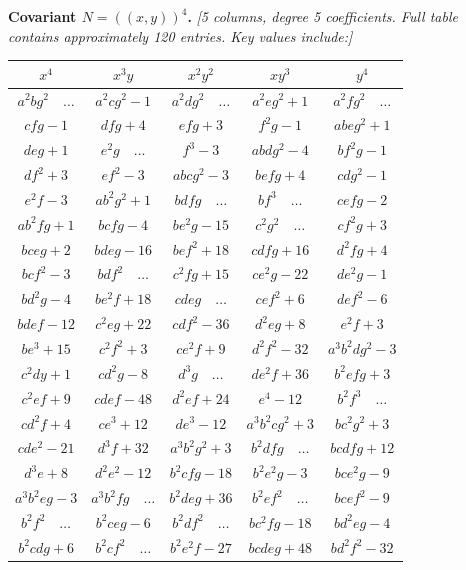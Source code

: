 \documentclass[11pt,a4paper]{book}
\begin{document}
\textbf{Covariant $N = (\!\!(x,y)\!\!)^{4}$.} \textit{[5 columns, degree 5 coefficients. Full table contains approximately 120 entries. Key values include:]}
\begin{center}
\small
\begin{tabular}{|c|c|c|c|c|}
\hline
$x^{4}$ & $x^{3}y$ & $x^{2}y^{2}$ & $xy^{3}$ & $y^{4}$ \\
\hline
$a^{2}bg^{2}\quad\dots$ & $a^{2}cg^{2}-1$ & $a^{2}dg^{2}\quad\dots$ & $a^{2}eg^{2}+1$ & $a^{2}fg^{2}\quad\dots$ \\
$cfg-1$ & $dfg+4$ & $efg+3$ & $f^{2}g-1$ & $abeg^{2}+1$ \\
$deg+1$ & $e^{2}g\quad\dots$ & $f^{3}-3$ & $abdg^{2}-4$ & $bf^{2}g-1$ \\
$df^{2}+3$ & $ef^{2}-3$ & $abcg^{2}-3$ & $befg+4$ & $cdg^{2}-1$ \\
$e^{2}f-3$ & $ab^{2}g^{2}+1$ & $bdfg\quad\dots$ & $bf^{3}\quad\dots$ & $cefg-2$ \\
$ab^{2}fg+1$ & $bcfg-4$ & $be^{2}g-15$ & $c^{2}g^{2}\quad\dots$ & $cf^{2}g+3$ \\
$bceg+2$ & $bdeg-16$ & $bef^{2}+18$ & $cdfg+16$ & $d^{2}fg+4$ \\
$bcf^{2}-3$ & $bdf^{2}\quad\dots$ & $c^{2}fg+15$ & $ce^{2}g-22$ & $de^{2}g-1$ \\
$bd^{2}g-4$ & $be^{2}f+18$ & $cdeg\quad\dots$ & $cef^{2}+6$ & $def^{2}-6$ \\
$bdef-12$ & $c^{2}eg+22$ & $cdf^{2}-36$ & $d^{2}eg+8$ & $e^{2}f+3$ \\
$be^{3}+15$ & $c^{2}f^{2}+3$ & $ce^{2}f+9$ & $d^{2}f^{2}-32$ & $a^{3}b^{2}dg^{2}-3$ \\
$c^{2}dy+1$ & $cd^{2}g-8$ & $d^{3}g\quad\dots$ & $de^{2}f+36$ & $b^{2}efg+3$ \\
$c^{2}ef+9$ & $cdef-48$ & $d^{2}ef+24$ & $e^{4}-12$ & $b^{2}f^{3}\quad\dots$ \\
$cd^{2}f+4$ & $ce^{3}+12$ & $de^{3}-12$ & $a^{3}b^{2}cg^{2}+3$ & $bc^{2}g^{2}+3$ \\
$cde^{2}-21$ & $d^{3}f+32$ & $a^{3}b^{2}g^{2}+3$ & $b^{2}dfg\quad\dots$ & $bcdfg+12$ \\
$d^{3}e+8$ & $d^{2}e^{2}-12$ & $b^{2}cfg-18$ & $b^{2}e^{2}g-3$ & $bce^{2}g-9$ \\
$a^{3}b^{2}eg-3$ & $a^{3}b^{2}fg\quad\dots$ & $b^{2}deg+36$ & $b^{2}ef^{2}\quad\dots$ & $bcef^{2}-9$ \\
$b^{2}f^{2}\quad\dots$ & $b^{2}ceg-6$ & $b^{2}df^{2}\quad\dots$ & $bc^{2}fg-18$ & $bd^{2}eg-4$ \\
$b^{2}cdg+6$ & $b^{2}cf^{2}\quad\dots$ & $b^{2}e^{2}f-27$ & $bcdeg+48$ & $bd^{2}f^{2}-32$ \\

\end{tabular}
\end{center}
\end{document}
